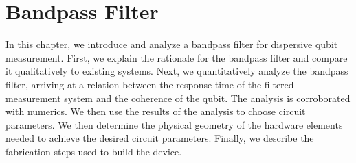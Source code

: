 \chapter{Bandpass Filter} \label{ch:bandpassFilter}

In this chapter, we introduce and analyze a bandpass filter for dispersive qubit measurement.
First, we explain the rationale for the bandpass filter and compare it qualitatively to existing systems.
Next, we quantitatively analyze the bandpass filter, arriving at a relation between the response time of the filtered measurement system and the coherence of the qubit.
The analysis is corroborated with numerics.
We then use the results of the analysis to choose circuit parameters.
We then determine the physical geometry of the hardware elements needed to achieve the desired circuit parameters.
Finally, we describe the fabrication steps used to build the device.


